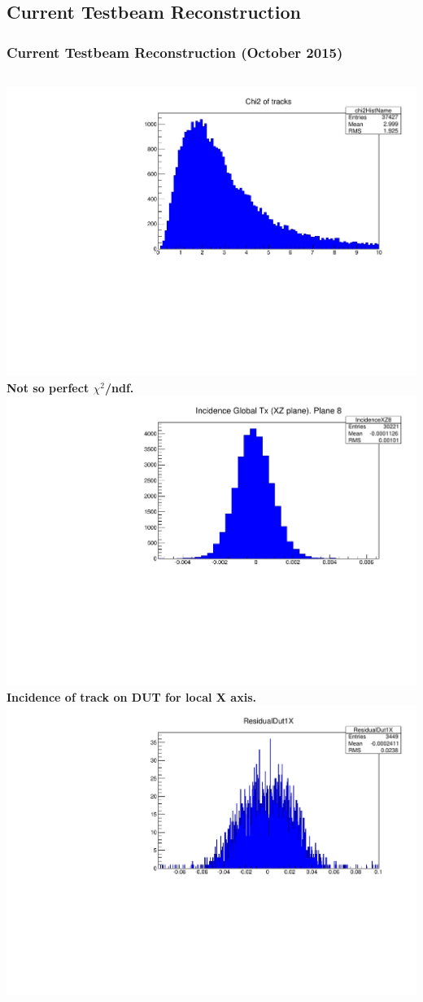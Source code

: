 \documentclass{beamer}
\begin{document}
\subsection{Current Testbeam Reconstruction}
\begin{frame}
\frametitle{Current Testbeam Reconstruction (October 2015)}
\begin{columns}[t]
\centering
\includegraphics[width=0.9\linewidth]{pics/chi_new.pdf}\\
\tiny{\textbf{Not so perfect $\chi^{2}$/ndf.}}\\
\includegraphics[width=0.9\linewidth]{pics/inc_new.pdf}\\
\tiny{\textbf{Incidence of track on DUT for local X axis. }}\\
\centering
\includegraphics[width=0.9\linewidth]{pics/Res_new.pdf}\\ 

\end{columns}
\end{frame}
\end{document}
